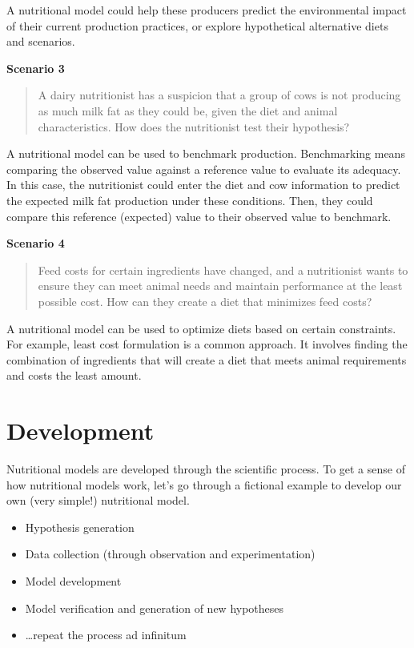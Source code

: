 \documentclass[
]{book}
\begin{document}
A nutritional model could help these producers predict the environmental impact of their current production practices, or explore hypothetical alternative diets and scenarios.

\textbf{Scenario 3}

\begin{quote}
A dairy nutritionist has a suspicion that a group of cows is not producing as much milk fat as they could be, given the diet and animal characteristics. How does the nutritionist test their hypothesis?
\end{quote}

A nutritional model can be used to benchmark production. Benchmarking means comparing the observed value against a reference value to evaluate its adequacy. In this case, the nutritionist could enter the diet and cow information to predict the expected milk fat production under these conditions. Then, they could compare this reference (expected) value to their observed value to benchmark.

\textbf{Scenario 4}

\begin{quote}
Feed costs for certain ingredients have changed, and a nutritionist wants to ensure they can meet animal needs and maintain performance at the least possible cost. How can they create a diet that minimizes feed costs?
\end{quote}

A nutritional model can be used to optimize diets based on certain constraints. For example, least cost formulation is a common approach. It involves finding the combination of ingredients that will create a diet that meets animal requirements and costs the least amount.

\hypertarget{development}{%
\section{Development}\label{development}}

Nutritional models are developed through the scientific process. To get a sense of how nutritional models work, let's go through a fictional example to develop our own (very simple!) nutritional model.

\begin{itemize}
\item
  Hypothesis generation
\item
  Data collection (through observation and experimentation)
\item
  Model development
\item
  Model verification and generation of new hypotheses
\item
  \ldots repeat the process ad infinitum
\end{itemize}
\end{document}
